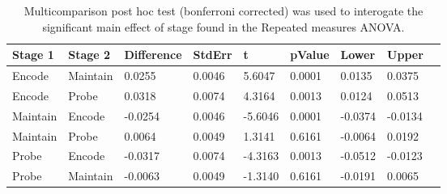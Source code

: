 \begin{table}
\centering
\begin{tabular}[0.2em]{@{}lllllllll@{}}\toprule
Stage 1 & Stage 2 & Difference & StdErr & t & pValue & Lower & Upper\\\toprule[0.2em]
Encode & Maintain & 0.0255 & 0.0046 & 5.6047 & 0.0001 & 0.0135 & 0.0375 \\\midrule
Encode & Probe & 0.0318 & 0.0074 & 4.3164 & 0.0013 & 0.0124 & 0.0513 \\\midrule
Maintain & Encode & -0.0254 & 0.0046 & -5.6046 & 0.0001 & -0.0374 & -0.0134 \\\midrule
Maintain & Probe & 0.0064 & 0.0049 & 1.3141 & 0.6161 & -0.0064 & 0.0192 \\\midrule
Probe & Encode & -0.0317 & 0.0074 & -4.3163 & 0.0013 & -0.0512 & -0.0123 \\\midrule
Probe & Maintain & -0.0063 & 0.0049 & -1.3140 & 0.6161 & -0.0191 & 0.0065 \\\bottomrule[0.2em]
\end{tabular}
\caption{Multicomparison post hoc test (bonferroni corrected) was used to interogate the significant main effect of stage found in the Repeated measures ANOVA.\label{tabel:tbl_RMAEFC1_PH_Stage}}
\end{table}
